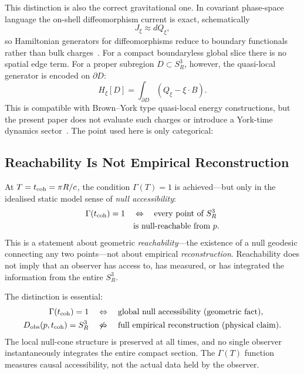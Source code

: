 \documentclass[aps,prd,onecolumn,superscriptaddress,longbibliography,nofootinbib,notitlepage]{revtex4-2}
\begin{document}
This distinction is also the correct gravitational one. In covariant phase-space
language the on-shell diffeomorphism current is exact, schematically
\begin{equation}
  J_\xi\approx dQ_\xi,
\end{equation}
so Hamiltonian generators for diffeomorphisms reduce to boundary functionals
rather than bulk charges~\cite{IyerWald1994}. For a compact boundaryless global
slice there is no spatial edge term. For a proper subregion $D\subset S^3_R$,
however, the quasi-local generator is encoded on $\partial D$:
\begin{equation}
  H_\xi[D]
  =
  \int_{\partial D}
  (Q_\xi-\xi\cdot B) .
\end{equation}
This is compatible with Brown--York type quasi-local energy constructions, but the
present paper does not evaluate such charges or introduce a York-time dynamics
sector~\cite{BrownYork1993}. The point used here is only categorical:
\begin{center}
\end{center}

\subsection{Reachability Is Not Empirical Reconstruction}

At $T = t_{\rm coh} = \pi R/c$, the condition $\Gamma(T) = 1$ is achieved---but
only in the idealised static model sense of \emph{null accessibility}:
\begin{equation}
\begin{aligned}
  \Gamma(t_{\rm coh}) = 1
  \quad &\Leftrightarrow \quad
  \text{every point of }S^3_R \\
  &\text{is null-reachable from }p .
\end{aligned}
\end{equation}
This is a statement about geometric \emph{reachability}---the existence of a null
geodesic connecting any two points---not about empirical \emph{reconstruction}.
Reachability does not imply that an observer has access to, has measured, or has
integrated the information from the entire $S^3_R$.

The distinction is essential:
\begin{align}
  \Gamma(t_{\rm coh}) = 1
  &\quad \Leftrightarrow \quad
    \text{global null accessibility (geometric fact)}, \\
  D_{\rm obs}(p, t_{\rm coh}) = S^3_R
  &\quad \not\Leftrightarrow \quad
    \text{full empirical reconstruction (physical claim)}.
\end{align}
The local null-cone structure is preserved at all times, and no single observer
instantaneously integrates the entire compact section. The $\Gamma(T)$ function
measures causal accessibility, not the actual data held by the observer.
\end{document}
